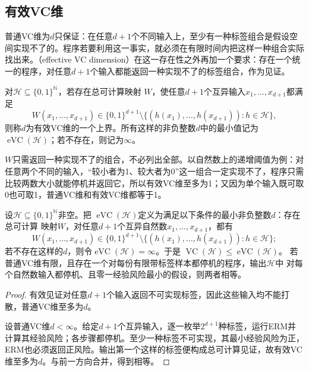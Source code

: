\subsection{有效VC维}

普通VC维为$d$只保证：在任意$d+1$个不同输入上，至少有一种标签组合是假设空间实现不了的。程序若要利用这一事实，就必须在有限时间内把这样一种组合实际找出来。（effective VC dimension）在这一存在性之外再加一个要求：存在一个统一的程序，对任意$d+1$个输入都能返回一种实现不了的标签组合，作为见证。

\begin{definition}[有效VC维]
\label{def:effective-vc-dimension}
对$\mathcal H\subseteq\{0,1\}^{\mathbb N}$，若存在总可计算映射
$W$，使任意$d+1$个互异输入$x_1,\ldots,x_{d+1}$都满足
\[
 W(x_1,\ldots,x_{d+1})\in\{0,1\}^{d+1}
 \setminus\{(h(x_1),\ldots,h(x_{d+1})):h\in\mathcal H\},
\]
则称$d$为有效VC维的一个上界。所有这样的非负整数$d$中的最小值记为
$\operatorname{eVC}(\mathcal H)$；若不存在，则记为$\infty$。
\end{definition}

$W$只需返回一种实现不了的组合，不必列出全部。以自然数上的递增阈值为例：对任意两个不同的输入，“较小者为1、较大者为0”这一组合一定实现不了，程序只需比较两数大小就能停机并返回它，所以有效VC维至多为1；又因为单个输入既可取0也可取1，普通VC维和有效VC维都等于1。

\begin{theorem}[普通VC维与有效VC维的比较]
\label{thm:effective-vc-comparison}
设$\mathcal H\subseteq\{0,1\}^{\mathbb N}$非空。把
$\operatorname{eVC}(\mathcal H)$定义为满足以下条件的最小非负整数$d$：存在总可计算
映射$W$，对任意$d+1$个互异自然数$x_1,\ldots,x_{d+1}$，都有
\[
 W(x_1,\ldots,x_{d+1})\in\{0,1\}^{d+1}
 \setminus\{(h(x_1),\ldots,h(x_{d+1})):h\in\mathcal H\};
\]
若不存在这样的$d$，则令$\operatorname{eVC}(\mathcal H)=\infty$。于是
$\operatorname{VC}(\mathcal H)\leq\operatorname{eVC}(\mathcal H)$。
若普通VC维有限，且存在一个对每份有限带标签样本都停机的程序，输出$\mathcal H$中
对每个自然数输入都停机、且零一经验风险最小的假设，则两者相等。
\end{theorem}

\begin{proof}
有效见证对任意$d+1$个输入返回不可实现标签，因此这些输入均不能打散，普通VC维至多为$d$。

设普通VC维$d<\infty$。给定$d+1$个互异输入，逐一枚举$2^{d+1}$种标签，运行ERM并计算其经验风险；各步骤都停机。至少一种标签不可实现，其最小经验风险为正，ERM也必须返回正风险。输出第一个这样的标签便构成总可计算见证，故有效VC维至多为$d$。与前一方向合并，得到相等。
\end{proof}


